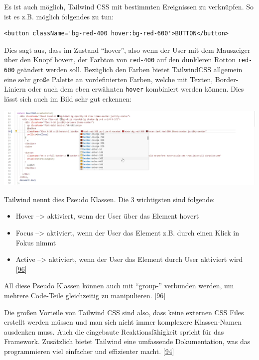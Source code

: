 \documentclass[
    headings=optiontotocandhead,%
    twoside,
    numbers=noenddot,%
    12pt, %
    titlepage, %
    parskip=full, %
    listof=leveldown, 
    numbers=noenddot, %
    a4paper,DIV=14,
    BCOR=15mm,
]{scrbook}
\newcommand{\passthrough}[1]{#1}
\let\origfigure=\figure
\let\endorigfigure=\endfigure
\renewenvironment{figure}[1][]{%
   \origfigure[H]
}{%
   \endorigfigure
}
\providecommand{\tightlist}{%
  \setlength{\itemsep}{0pt}\setlength{\parskip}{0pt}}
\begin{document}
Es ist auch möglich, Tailwind CSS mit bestimmten Ereignissen zu
verknüpfen. So ist es z.B. möglich folgendes zu tun:

\begin{lstlisting}[caption={Hover Funktion von Tailwind CSS}]
<button className='bg-red-400 hover:bg-red-600'>BUTTON</button>
\end{lstlisting}

Dies sagt aus, dass im Zustand ``hover'', also wenn der User mit dem
Mauszeiger über den Knopf hovert, der Farbton von
\passthrough{\lstinline!red-400!} auf den dunkleren Rotton
\passthrough{\lstinline!red-600!} geändert werden soll. Bezüglich den
Farben bietet TailwindCSS allgemein eine sehr große Palette an
vordefinierten Farben, welche mit Texten, Border-Liniern oder auch dem
eben erwähnten \passthrough{\lstinline!hover!} kombiniert werden können.
Dies lässt sich auch im Bild sehr gut erkennen:

\begin{figure}
\centering
\includegraphics{img/Gekle/TailwindCSS-Colors-Example.PNG}
\caption{Vordefinierte Farben von TailwindCSS}
\end{figure}

Tailwind nennt dies Pseudo Klassen. Die 3 wichtigsten sind folgende:

\begin{itemize}
\tightlist
\item
  Hover --\textgreater{} aktiviert, wenn der User über das Element
  hovert
\item
  Focus --\textgreater{} aktiviert, wenn der User das Element z.B. durch
  einen Klick in Fokus nimmt
\item
  Active --\textgreater{} aktiviert, wenn der User das Element durch
  User aktiviert wird
  {[}\protect\hyperlink{ref-TailwindCSS-DocsV1}{96}{]}
\end{itemize}

All diese Pseudo Klassen können auch mit ``group-'' verbunden werden, um
mehrere Code-Teile gleichzeitig zu manipulieren.
{[}\protect\hyperlink{ref-TailwindCSS-DocsV1}{96}{]}

Die großen Vorteile von Tailwind CSS sind also, dass keine externen CSS
Files erstellt werden müssen und man sich nicht immer komplexere
Klassen-Namen ausdenken muss. Auch die eingebaute Reaktionsfähigkeit
spricht für das Framework. Zusätzlich bietet Tailwind eine umfassende
Dokumentation, was das programmieren viel einfacher und effizienter
macht. {[}\protect\hyperlink{ref-GeeksForGeeks-TailwindCSS}{94}{]}
\end{document}
